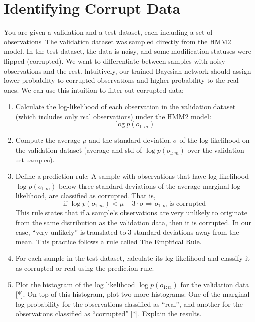 \documentclass[a4 paper]{article}
\begin{document}
\section{Identifying Corrupt Data}
You are given a validation and a test dataset, each including a set of observations. The validation dataset was sampled directly from the HMM2 model. In the test dataset, the data is noisy, and some modification statuses were flipped (corrupted). We want to differentiate between samples with noisy observations and the rest. Intuitively, our trained Bayesian network should assign lower probability to corrupted observations and higher probability to the real ones. We can use this intuition to filter out corrupted data:

\begin{enumerate}
    \item Calculate the log-likelihood of each observation in the validation dataset (which includes only real observations) under the HMM2 model:
    \[
    \log p(o_{1:m})
    \]
    
    \item Compute the average \( \mu \) and the standard deviation \( \sigma \) of the log-likelihood on the validation dataset (average and std of \( \log p(o_{1:m}) \) over the validation set samples).
    
    \item Define a prediction rule: A sample with observations that have log-likelihood \( \log p(o_{1:m}) \) below three standard deviations of the average marginal log-likelihood, are classified as corrupted. That is,
    \[
    \text{if } \log p(o_{1:m}) < \mu - 3 \cdot \sigma \Rightarrow o_{1:m} \text{ is corrupted}
    \]
    This rule states that if a sample’s observations are very unlikely to originate from the same distribution as the validation data, then it is corrupted. In our case, “very unlikely” is translated to 3 standard deviations away from the mean. This practice follows a rule called The Empirical Rule.
    
    \item For each sample in the test dataset, calculate its log-likelihood and classify it as corrupted or real using the prediction rule.
    
    \item Plot the histogram of the log likelihood \( \log p(o_{1:m}) \) for the validation data [*]. On top of this histogram, plot two more histograms: One of the marginal log probability for the observations classified as “real”, and another for the observations classified as “corrupted” [*]. Explain the results.
\end{enumerate}
\end{document}
